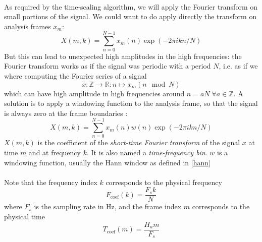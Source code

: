 \documentclass[letterpaper]{article}
\theoremstyle{definition}
\theoremstyle{remark}
\theoremstyle{plain}
\begin{document}
\paragraph{}
As required by the time-scaling algorithm, we will apply the Fourier transform
on small portions of the signal. We could want to do apply directly the
transform on analysis frames \(x_m\):
\begin{equation*}
X(m,k)=\sum_{n=0}^{N-1}x_m(n)\exp(-2\pi ikn/N)
\end{equation*}
But this can lead to unexpected high amplitudes in the high frequencies:
the Fourier transform works as if the signal was periodic with a period \(N\),
i.e. as if we where computing the Fourier series of a signal
\begin{equation}
\tilde x:\mathbb{Z}\to\mathbb{R}:n\mapsto x_m(n\mod N)
\end{equation}
which can have high amplitude in high frequencies around
\(n=aN\;\forall a\in\mathbb{Z}\).
A solution is to apply a windowing function to the analysis frame, so that the
signal is always zero at the frame boundaries \citep{gabor1946theory}:
\begin{equation}
    X(m,k) = \sum_{n=0}^{N-1}x_m(n)w(n)\exp(-2\pi ikn/N)
\end{equation}
\(X(m,k)\) is the coefficient of the \emph{short-time Fourier transform} of
the signal \(x\) at time \(m\) and at frequency \(k\). It is also named a
\emph{time-frequency bin}. \(w\) is a windowing function, usually the Hann
window as defined in \eqref{hann}

\paragraph{}
Note that the frequency index \(k\) corresponds to the physical frequency
\begin{equation}
		\label{frequency_index}
    F_{\text{coef}}(k) = \frac{F_s k}{N}
\end{equation}
where \(F_s\) is the sampling rate in Hz, and the frame index \(m\) corresponds
to the physical time
\begin{equation}
    T_{\text{coef}}(m) = \frac{H_a m}{F_s}
\end{equation}
\end{document}
